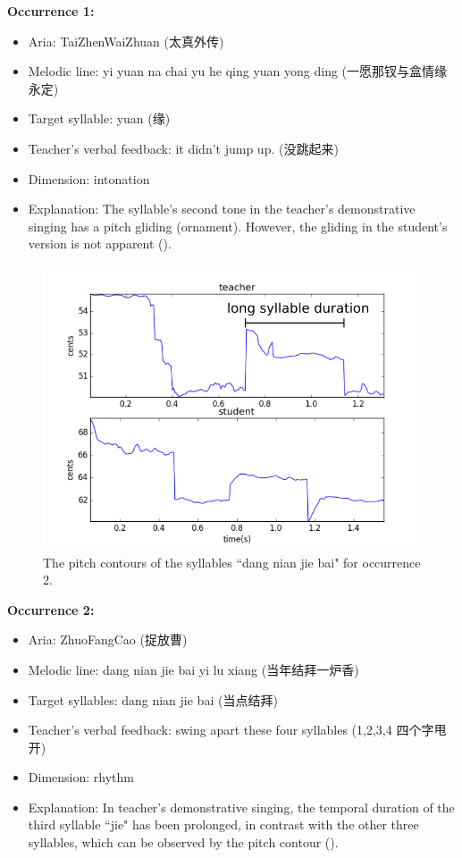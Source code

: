 \noindent\textbf{Occurrence 1:}

\begin{itemize}[leftmargin=*, noitemsep]
\item Aria: TaiZhenWaiZhuan (太真外传)
\item Melodic line: yi yuan na chai yu he qing yuan yong ding (一愿那钗与盒情缘永定)
\item Target syllable: yuan (缘)
\item Teacher's verbal feedback: it didn't jump up. (没跳起来) 
\item Dimension: intonation
\item Explanation: The syllable's second tone in the teacher's demonstrative singing has a pitch gliding (ornament). However, the gliding in the student's version is not apparent ().
\end{itemize}

\begin{figure}[ht!]
\includegraphics[width=\textwidth]{figs/spectro_vis/ch3_occ2.png}
\caption{The pitch contours of the syllables ``dang nian jie bai" for occurrence 2.}
\label{fig:occurrence_2}
\end{figure}

\noindent\textbf{Occurrence 2:}

\begin{itemize}[leftmargin=*, noitemsep]
\item Aria: ZhuoFangCao (捉放曹)
\item Melodic line: dang nian jie bai yi lu xiang (当年结拜一炉香)
\item Target syllables: dang nian jie bai (当点结拜)
\item Teacher's verbal feedback: swing apart these four syllables (1,2,3,4 四个字甩开)
\item Dimension: rhythm
\item Explanation: In teacher's demonstrative singing, the temporal duration of the third syllable ``jie" has been prolonged, in contrast with the other three syllables, which can be observed by the pitch contour ().
\end{itemize}

